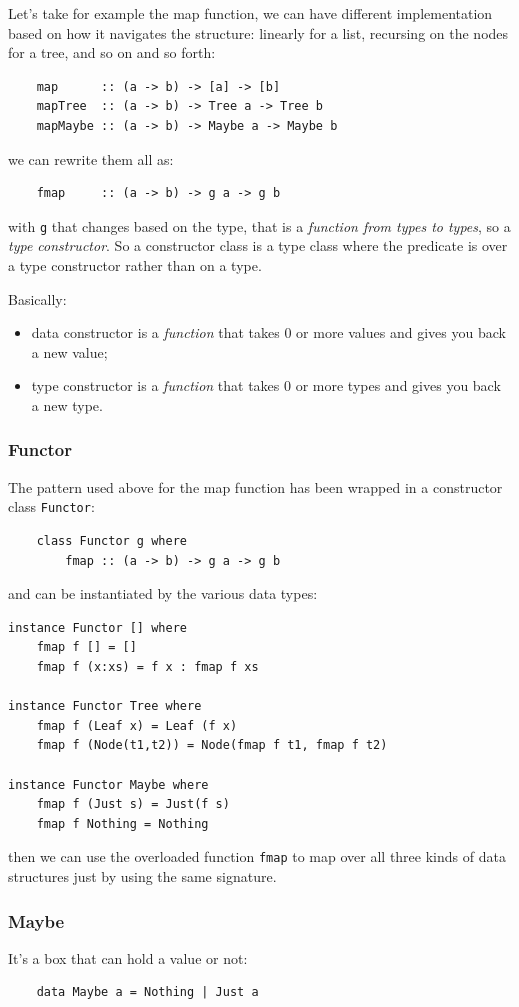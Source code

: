 Let's take for example the map function, we can have different implementation based on how it navigates the structure: linearly for a list, recursing on the nodes for a tree, and so on and so forth:
\begin{verbatim}
    map      :: (a -> b) -> [a] -> [b]
    mapTree  :: (a -> b) -> Tree a -> Tree b
    mapMaybe :: (a -> b) -> Maybe a -> Maybe b
\end{verbatim}
we can rewrite them all as:
\begin{verbatim}
    fmap     :: (a -> b) -> g a -> g b
\end{verbatim}
with \verb|g| that changes based on the type, that is a \emph{function from types to types}, so a \emph{type constructor}.
So a constructor class is a type class where the predicate is over a type constructor rather than on a type.

Basically:
\begin{itemize}
    \item data constructor is a \emph{function} that takes 0 or more values and gives you back a new value;
    \item type constructor is a \emph{function} that takes 0 or more types and gives you back a new type.
\end{itemize}

\subsubsection{Functor}
The pattern used above for the map function has been wrapped in a constructor class \verb|Functor|:
\begin{verbatim}
    class Functor g where
        fmap :: (a -> b) -> g a -> g b
\end{verbatim}
and can be instantiated by the various data types:
\begin{verbatim}
instance Functor [] where
    fmap f [] = []
    fmap f (x:xs) = f x : fmap f xs

instance Functor Tree where
    fmap f (Leaf x) = Leaf (f x)
    fmap f (Node(t1,t2)) = Node(fmap f t1, fmap f t2)

instance Functor Maybe where
    fmap f (Just s) = Just(f s)
    fmap f Nothing = Nothing 
\end{verbatim}
then we can use the overloaded function \verb|fmap| to map over all three kinds of data structures just by using the same signature.

\subsubsection{Maybe}
It's a box that can hold a value or not:
\begin{verbatim}
    data Maybe a = Nothing | Just a
\end{verbatim}

